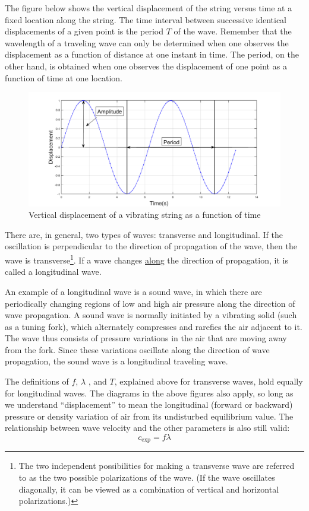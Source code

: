 The figure below shows the vertical displacement of the string versus time at a fixed location along the string. The time interval between successive identical displacements of a given point is the period $T$ of the wave. Remember that the wavelength of a traveling wave can only be determined when one observes the displacement as a function of distance at one instant in time. The period, on the other hand, is obtained when one observes the displacement of one point as a function of time at one location.\myskip
\begin{figure}[h]
\centering
\includegraphics[width=1.0\textwidth]{./Exp1-9/pic/page02.png}
\caption{Vertical displacement of a vibrating string as a function of time}
\end{figure}

There are, in general, two types of waves: transverse and longitudinal. If the oscillation is perpendicular to the direction of propagation of the wave, then the wave is transverse\footnote{The two independent possibilities for making a transverse wave are referred to as the two possible polarizations of the wave. (If the wave oscillates diagonally, it can be viewed as a combination of vertical and horizontal polarizations.)}. If a wave changes \underline{along} the direction of propagation, it is called a longitudinal wave. \myskip

An example of a longitudinal wave is a sound wave, in which there are periodically changing regions of low and high air pressure along the direction of wave propagation. A sound wave is normally initiated by a vibrating solid (such as a tuning fork), which alternately compresses and rarefies the air adjacent to it. The wave thus consists of pressure variations in the air that are moving away from the fork. Since these variations oscillate along the direction of wave propagation, the sound wave is a longitudinal traveling wave.\myskip

The definitions of $f$, $\lambda$ , and $T$, explained above for transverse waves, hold equally for longitudinal waves. The diagrams in the above figures also apply, so long as we understand ``displacement'' to mean the longitudinal (forward or backward) pressure or density variation of air from its undisturbed equilibrium value. The relationship between wave velocity and the other parameters is also still valid:
\begin{equation}
  c_{\text{exp}}=f\lambda
\end{equation}

